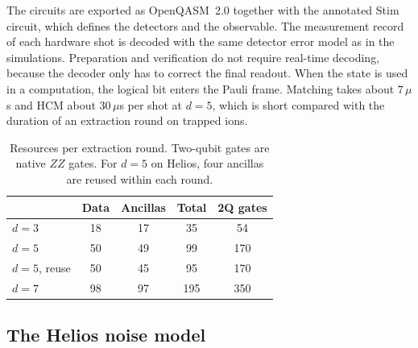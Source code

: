 The circuits are exported as OpenQASM~2.0 together with the annotated Stim circuit, which defines the detectors and the observable. The measurement record of each hardware shot is decoded with the same detector error model as in the simulations. Preparation and verification do not require real-time decoding, because the decoder only has to correct the final readout. When the state is used in a computation, the logical bit enters the Pauli frame. Matching takes about $7\,\mu$s and HCM about $30\,\mu$s per shot at $d=5$, which is short compared with the duration of an extraction round on trapped ions.

\begin{table}[t]
  \caption{Resources per extraction round. Two-qubit gates are native $ZZ$ gates. For $d=5$ on Helios, four ancillas are reused within each round.}
  \label{tab:resources}
  \begin{ruledtabular}
  \begin{tabular}{lcccc}
    & Data & Ancillas & Total & 2Q gates \\
    \hline
    $d=3$ & 18 & 17 & 35 & 54 \\
    $d=5$ & 50 & 49 & 99 & 170 \\
    $d=5$, reuse & 50 & 45 & 95 & 170 \\
    $d=7$ & 98 & 97 & 195 & 350 \\
  \end{tabular}
  \end{ruledtabular}
\end{table}

\subsection{The Helios noise model}
\label{sec:helios_model}

